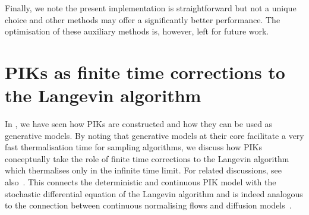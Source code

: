 \documentclass[reprint,amsmath,amssymb,aps,pra,superscriptaddress,nofootinbib,twocolumn,floatfix,nolongbibliography]{revtex4-2}
\begin{document}
Finally, we note the present implementation is straightforward but not a unique choice and other methods may offer a significantly better performance. The optimisation of these auxiliary methods is, however, left for future work.


\section{PIKs as finite time corrections to the Langevin algorithm}
\label{sec:PIKFiniteTimeLangevinCorrection}

In , we have seen how PIKs are constructed and how they can be used as generative models. By noting that generative models at their core facilitate a very fast thermalisation time for sampling algorithms, we discuss how PIKs conceptually take the role of finite time corrections to the Langevin algorithm which thermalises only in the infinite time limit. For related discussions, see also~\cite{Albergo:2025nets}. This connects the deterministic and continuous PIK model with the stochastic differential equation of the Langevin algorithm and is indeed analogous to the connection between continuous normalising flows and diffusion models~\cite{Song:2021sbgm}. 
\end{document}
